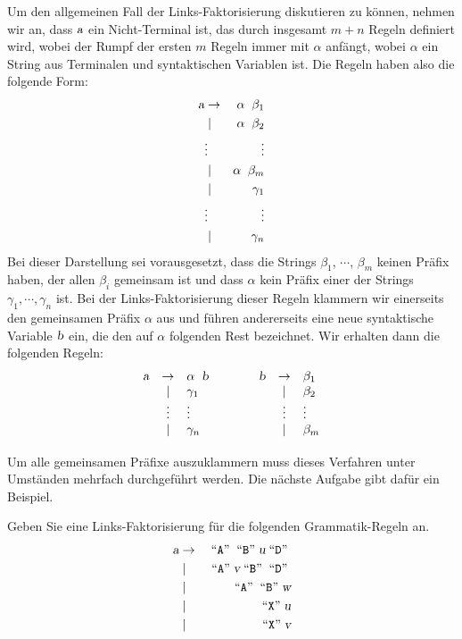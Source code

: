 Um den allgemeinen Fall der Links-Faktorisierung diskutieren zu können, nehmen wir an, dass
$\textsl{a}$ ein Nicht-Terminal ist, das durch insgesamt $m + n$ Regeln definiert wird, wobei der
Rumpf der ersten $m$ Regeln immer mit $\alpha$ anfängt, wobei $\alpha$ ein String aus
Terminalen und syntaktischen Variablen ist.  Die Regeln haben also die folgende Form:
\begin{eqnarray*}
  \textsl{a} & \rightarrow & \alpha \;\; \beta_1 \\
    & \mid        & \alpha \;\; \beta_2 \\
    & \vdots      & \vdots              \\
    & \mid        & \alpha \;\; \beta_m \\
    & \mid        & \gamma_1            \\
    & \vdots      & \vdots              \\
    & \mid        & \gamma_n            
\end{eqnarray*}
Bei dieser Darstellung sei vorausgesetzt, dass die Strings $\beta_1$, $\cdots$, $\beta_m$
keinen  Präfix haben, der allen $\beta_i$ gemeinsam ist und dass $\alpha$ kein Präfix einer der Strings
$\gamma_1, \cdots, \gamma_n$ ist.  Bei der Links-Faktorisierung dieser Regeln klammern wir einerseits den
gemeinsamen Präfix $\alpha$ aus und führen andererseits eine neue syntaktische Variable $\textsl{b}$ ein, die
den auf $\alpha$ folgenden Rest bezeichnet.  Wir erhalten dann die folgenden Regeln:
\[
\begin{array}{lclclcl}
  \textsl{a} & \rightarrow & \alpha \;\; \textsl{b} & \qquad & \textsl{b} & \rightarrow & \beta_1   \\
    & \mid        & \gamma_1      &        &   & \mid        & \beta_2   \\
    & \vdots      & \vdots        &        &   & \vdots      & \vdots    \\
    & \mid        & \gamma_n      &        &   & \mid        & \beta_m   \\[0.2cm]
\end{array}
\]
Um alle gemeinsamen Präfixe auszuklammern muss dieses Verfahren unter 
Umständen mehrfach durchgeführt werden.  Die nächste Aufgabe gibt dafür ein Beispiel.

\exercise
Geben Sie eine Links-Faktorisierung für die folgenden Grammatik-Regeln an.
\begin{eqnarray*}
  \textsl{a} & \rightarrow & \;\mbox{``\texttt{A}''}\; \;\mbox{``\texttt{B}''}\; \textsl{u} \;\mbox{``\texttt{D}''}\; \\
             & \mid        & \;\mbox{``\texttt{A}''}\; \textsl{v} \;\mbox{``\texttt{B}''}\; \;\mbox{``\texttt{D}''}\; \\
             & \mid        & \;\mbox{``\texttt{A}''}\; \;\mbox{``\texttt{B}''}\; \textsl{w}            \\
             & \mid        & \;\mbox{``\texttt{X}''}\; \textsl{u}                       \\
             & \mid        & \;\mbox{``\texttt{X}''}\; \textsl{v}                       
\end{eqnarray*}

